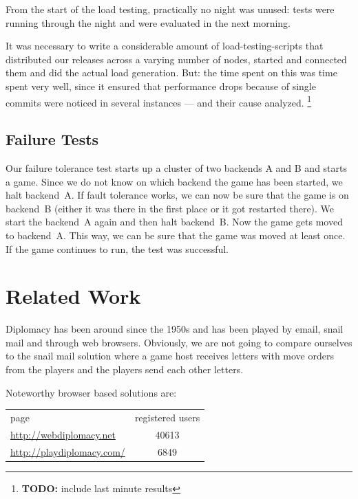 \documentclass[11pt,a4paper]{report}
\newcommand{\hi}[1]{{\color{red}\em #1\/}\\}
\newcommand{\todo}[1]{\footnote{{\color{red} {\bf TODO:} #1}}}
\begin{document}
From the start of the load testing, practically no night was unused: tests were
running through the night and were evaluated in the next morning.

It was necessary to write a considerable amount of load-testing-scripts that
distributed our releases across a varying number of nodes, started and connected
them and did the actual load generation. But: the time spent on this was time
spent very well, since it ensured that performance drops because of single
commits were noticed in several instances --- and their cause analyzed.
\todo{include last minute results}
\section{Failure Tests}
Our failure tolerance test starts up a cluster of two backends A and B and starts
a game.
Since we do not know on which backend the game has been started, we halt
backend~A. If fault tolerance works, we can now be sure that the game is on backend~B
(either it was there in the first place or it got restarted there).
We start the backend~A again and then halt backend~B. Now the game gets moved to
backend~A. This way, we can be sure that the game was moved at least once.
If the game continues to run, the test was successful.

\chapter{Related Work}


Diplomacy has been around since the 1950s and has been played by email, snail
mail and through web browsers. Obviously, we are not going to compare ourselves
to the snail mail solution where a game host receives letters with move orders
from the players and the players send each other letters.

Noteworthy browser based solutions are:\\
\begin{tabular}{lc}
  page                            & registered users \\
  \url{http://webdiplomacy.net}   & 40613 \\
  \url{http://playdiplomacy.com/} & 6849
\end{tabular}
\end{document}
